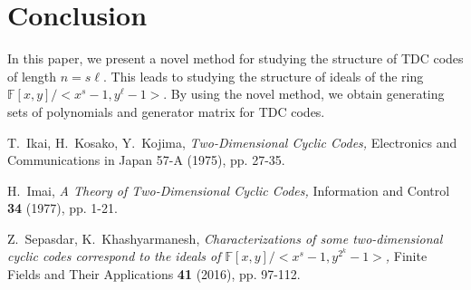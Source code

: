 \documentclass{amsart}
\theoremstyle{definition}
\theoremstyle{definitions}
\theoremstyle{notations}
\theoremstyle{note}
\theoremstyle{remarks}
\begin{document}
\section{Conclusion}
In this paper, we present a novel method for studying the structure of TDC codes of length $n=s\ell$. This leads to studying the structure of ideals of the ring ${\mathbb{F}}[x,y]/<x^s-1,y^{\ell}-1>$. By using the novel method, we obtain generating sets of polynomials and generator matrix for TDC codes. 

\begin{thebibliography}{9999}

T.~Ikai, H.~Kosako, Y.~Kojima,
{\em Two-Dimensional Cyclic Codes,}
Electronics and Communications in Japan 57-A (1975), pp. 27-35.

H.~Imai, 
{\em A Theory of Two-Dimensional Cyclic Codes,}
Information and Control {\bf 34} (1977), pp. 1-21.

Z.~Sepasdar, K.~Khashyarmanesh,
{\em Characterizations of some two-dimensional cyclic codes correspond to the ideals of ${\mathbb{F}}[x, y]/<x^s-1,y^{2^k}-1>$,}
Finite Fields and Their Applications {\bf 41} (2016), pp. 97-112.

\end{thebibliography}
 
\end{document}
